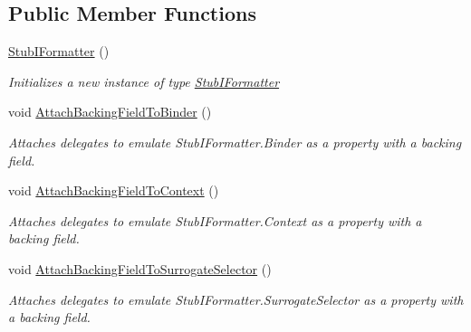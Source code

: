 \subsection*{Public Member Functions}
\begin{DoxyCompactItemize}
\item 
\hyperlink{class_system_1_1_runtime_1_1_serialization_1_1_fakes_1_1_stub_i_formatter_a42be065e2c3719fa60e5abdb867ca44a}{Stub\-I\-Formatter} ()
\begin{DoxyCompactList}\small\item\em Initializes a new instance of type \hyperlink{class_system_1_1_runtime_1_1_serialization_1_1_fakes_1_1_stub_i_formatter}{Stub\-I\-Formatter}\end{DoxyCompactList}\item 
void \hyperlink{class_system_1_1_runtime_1_1_serialization_1_1_fakes_1_1_stub_i_formatter_afd9e44b22b1d41e7b4856a828158ab67}{Attach\-Backing\-Field\-To\-Binder} ()
\begin{DoxyCompactList}\small\item\em Attaches delegates to emulate Stub\-I\-Formatter.\-Binder as a property with a backing field.\end{DoxyCompactList}\item 
void \hyperlink{class_system_1_1_runtime_1_1_serialization_1_1_fakes_1_1_stub_i_formatter_a431e958124e30447d29e2013b8791402}{Attach\-Backing\-Field\-To\-Context} ()
\begin{DoxyCompactList}\small\item\em Attaches delegates to emulate Stub\-I\-Formatter.\-Context as a property with a backing field.\end{DoxyCompactList}\item 
void \hyperlink{class_system_1_1_runtime_1_1_serialization_1_1_fakes_1_1_stub_i_formatter_a3c4a4315279a614d3cc851ba6149e26b}{Attach\-Backing\-Field\-To\-Surrogate\-Selector} ()
\begin{DoxyCompactList}\small\item\em Attaches delegates to emulate Stub\-I\-Formatter.\-Surrogate\-Selector as a property with a backing field.\end{DoxyCompactList}\end{DoxyCompactItemize}
